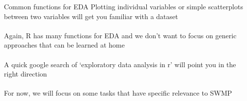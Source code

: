 \documentclass[xcolor=svgnames]{beamer}\usepackage[]{graphicx}\usepackage[]{color}
\makeatletter
\newcommand{\hlstr}[1]{\textcolor[rgb]{0.192,0.494,0.8}{#1}}%
\newcommand{\hlcom}[1]{\textcolor[rgb]{0.678,0.584,0.686}{\textit{#1}}}%
\newcommand{\hlopt}[1]{\textcolor[rgb]{0,0,0}{#1}}%
\newcommand{\hlstd}[1]{\textcolor[rgb]{0.345,0.345,0.345}{#1}}%
\newcommand{\hlkwc}[1]{\textcolor[rgb]{0.333,0.667,0.333}{#1}}%
\newcommand{\hlkwd}[1]{\textcolor[rgb]{0.737,0.353,0.396}{\textbf{#1}}}%
\newenvironment{kframe}{%
 \def\at@end@of@kframe{}%
 \ifinner\ifhmode%
  \def\at@end@of@kframe{\end{minipage}}%
  \begin{minipage}{\columnwidth}%
 \fi\fi%
 \def\FrameCommand##1{\hskip\@totalleftmargin \hskip-\fboxsep
 \colorbox{shadecolor}{##1}\hskip-\fboxsep
     \hskip-\linewidth \hskip-\@totalleftmargin \hskip\columnwidth}%
 \MakeFramed {\advance\hsize-\width
   \@totalleftmargin\z@ \linewidth\hsize
   \@setminipage}}%
 {\par\unskip\endMakeFramed%
 \at@end@of@kframe}
\newenvironment{knitrout}{}{} %
\makeatother
\begin{document}

\begin{frame}{Common functions for EDA}
Plotting individual variables or simple scatterplots between two variables will get you familiar with a dataset\\~\\
Again, R has many functions for EDA and we don't want to focus on generic approaches that can be learned at home \\~\\
A quick google search of `exploratory data analysis in r' will point you in the right direction \\~\\
For now, we will focus on some tasks that have specific relevance to SWMP
\end{frame}
\end{document}
